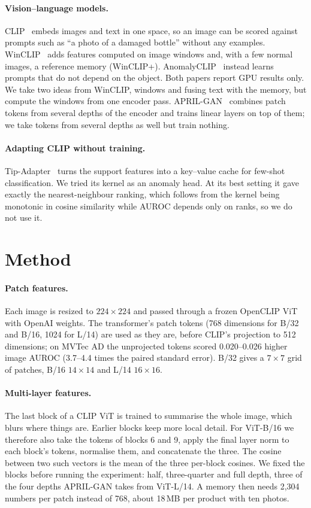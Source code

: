 \documentclass[10pt,twocolumn]{article}
\begin{document}
\paragraph{Vision--language models.} CLIP~\cite{radford2021clip} embeds images
and text in one space, so an image can be scored against prompts such as ``a photo
of a damaged bottle'' without any examples. WinCLIP~\cite{jeong2023winclip} adds
features computed on image windows and, with a few normal images, a reference
memory (WinCLIP+). AnomalyCLIP~\cite{zhou2024anomalyclip} instead learns prompts
that do not depend on the object. Both papers report GPU results only. We take two
ideas from WinCLIP, windows and fusing text with the memory, but compute the
windows from one encoder pass. APRIL-GAN~\cite{chen2023aprilgan} combines patch
tokens from several depths of the encoder and trains linear layers on top of
them; we take tokens from several depths as well but train nothing.

\paragraph{Adapting CLIP without training.} Tip-Adapter~\cite{zhang2022tipadapter}
turns the support features into a key--value cache for few-shot classification.
We tried its kernel as an anomaly head. At its best setting it gave exactly the
nearest-neighbour ranking, which follows from the kernel being monotonic in
cosine similarity while AUROC depends only on ranks, so we do not use it.

\section{Method}

\paragraph{Patch features.} Each image is resized to $224\times224$ and passed
through a frozen OpenCLIP ViT with OpenAI weights. The transformer's patch tokens
(768 dimensions for B/32 and B/16, 1024 for L/14) are used as they are, before
CLIP's projection to 512 dimensions; on MVTec AD the unprojected tokens scored
0.020--0.026 higher image AUROC (3.7--4.4 times the paired standard error).
B/32 gives a $7\times7$ grid of patches, B/16 $14\times14$ and L/14 $16\times16$.

\paragraph{Multi-layer features.} The last block of a CLIP ViT is trained to
summarise the whole image, which blurs where things are. Earlier blocks keep more
local detail. For ViT-B/16 we therefore also take the tokens of blocks 6 and 9,
apply the final layer norm to each block's tokens, normalise them, and concatenate
the three. The cosine between two such vectors is the mean of the three per-block
cosines. We fixed the blocks before running the experiment: half, three-quarter
and full depth, three of the four depths APRIL-GAN takes from ViT-L/14. A memory
then needs 2,304 numbers per patch instead of 768, about 18\,MB per product with
ten photos.
\end{document}
